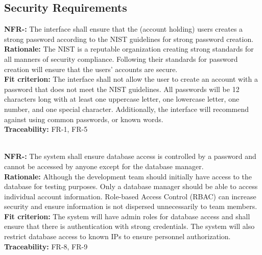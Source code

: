 \documentclass[12pt, titlepage]{article}
\newcounter{NFR_Counter}
\newcounter{FR_Counter}
\begin{document}
\subsection{Security Requirements}
\noindent\textbf{NFR-\the\value{NFR_Counter}:}
The interface shall ensure that the (account holding) users creates a strong password
according to the NIST guidelines for strong password creation.  \\
\textbf{Rationale:}
The NIST is a reputable organization creating strong standards for all manners of security compliance. 
Following their standards for password creation will ensure that the users' accounts are secure. \\
\textbf{Fit criterion:}
The interface shall not allow the user to create an account with a password that does not meet the NIST guidelines.
All passwords will be 12 characters long with at least one uppercase letter, one lowercase letter, one number, and one special character. 
Additionally, the interface will recommend against using common passwords, or known words. \\
\textbf{Traceability:}
FR-1, FR-5\\~\\
\addtocounter{NFR_Counter}{1}

\noindent\textbf{NFR-\the\value{NFR_Counter}:}
The system shall ensure database access is controlled by a password and cannot be accessed by anyone except for the database manager.  \\
\textbf{Rationale:}
Although the development team should initially have access to the database for testing purposes. 
Only a database manager should be able to access individual account information. 
Role-based Access Control (RBAC) can increase security and ensure information is not dispersed unnecessarily to team members.    \\
\textbf{Fit criterion:}
The system will have admin roles for database access and shall ensure that there is authentication with strong credentials. 
The system will also restrict database access to known IPs to ensure personnel authorization. \\
\textbf{Traceability:}
FR-8, FR-9\\~\\
\addtocounter{NFR_Counter}{1}
\end{document}
